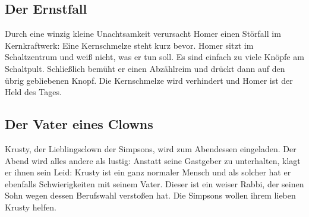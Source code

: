 	
\subsection{Der Ernstfall}\label{8F04}
Durch eine winzig kleine Unachtsamkeit verursacht Homer einen Störfall im Kernkraftwerk: Eine Kernschmelze steht kurz bevor. Homer sitzt im Schaltzentrum und weiß nicht, was er tun soll. Es sind einfach zu viele Knöpfe am Schaltpult. Schließlich bemüht er einen Abzählreim und drückt dann auf den übrig gebliebenen Knopf. Die Kernschmelze wird verhindert und Homer ist der Held des Tages.

	
\subsection{Der Vater eines Clowns}\label{8F05}
Krusty, der Lieblingsclown der Simpsons, wird zum Abendessen eingeladen. Der Abend wird alles andere als lustig: Anstatt seine Gastgeber zu unterhalten, klagt er ihnen sein Leid: Krusty ist ein ganz normaler Mensch und als solcher hat er ebenfalls Schwierigkeiten mit seinem Vater. Dieser ist ein weiser Rabbi, der seinen Sohn wegen dessen Berufswahl verstoßen hat. Die Simpsons wollen ihrem lieben Krusty helfen.


